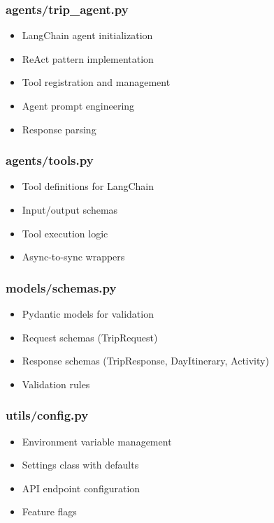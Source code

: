 \documentclass[12pt,a4paper]{report}
\begin{document}
\subsubsection{agents/trip\_agent.py}
\begin{itemize}
    \item LangChain agent initialization
    \item ReAct pattern implementation
    \item Tool registration and management
    \item Agent prompt engineering
    \item Response parsing
\end{itemize}

\subsubsection{agents/tools.py}
\begin{itemize}
    \item Tool definitions for LangChain
    \item Input/output schemas
    \item Tool execution logic
    \item Async-to-sync wrappers
\end{itemize}

\subsubsection{models/schemas.py}
\begin{itemize}
    \item Pydantic models for validation
    \item Request schemas (TripRequest)
    \item Response schemas (TripResponse, DayItinerary, Activity)
    \item Validation rules
\end{itemize}

\subsubsection{utils/config.py}
\begin{itemize}
    \item Environment variable management
    \item Settings class with defaults
    \item API endpoint configuration
    \item Feature flags
\end{itemize}
\end{document}
